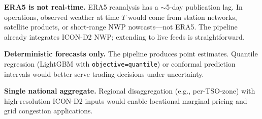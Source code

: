 \documentclass[11pt,a4paper]{article}
\begin{document}
\textbf{ERA5 is not real-time.}
ERA5 reanalysis has a ${\sim}$5-day publication lag.
In operations, observed weather at time $T$ would come from station networks, satellite products, or short-range NWP nowcasts---not ERA5.
The pipeline already integrates ICON-D2 NWP; extending to live feeds is straightforward.

\textbf{Deterministic forecasts only.}
The pipeline produces point estimates.
Quantile regression (LightGBM with \texttt{objective=quantile}) or conformal prediction intervals would better serve trading decisions under uncertainty.

\textbf{Single national aggregate.}
Regional disaggregation (e.g., per-TSO-zone) with high-resolution ICON-D2 inputs would enable locational marginal pricing and grid congestion applications.
\end{document}
